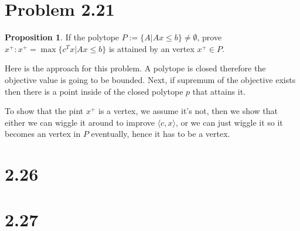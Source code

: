 \documentclass[]{article}
\theoremstyle{definition}
\newtheorem{prop}{Proposition}
\begin{document}
\section{Problem 2.21}
    \begin{prop}
        If the polytope $P:= \{A| Ax \le b\}\neq \emptyset$, prove $x^+: x^+ = \max \{c^Tx | Ax \le b\}$ is attained by an vertex $x^+\in P$. 
    \end{prop}
    \par
    Here is the approach for this problem. A polytope is closed therefore the objective value is going to be bounded. Next, if supremum of the objective exists then there is a point inside of the closed polytope $p$ that attains it. 
    \par
    To show that the pint $x^+$ is a vertex, we assume it's not, then we show that either we can wiggle it around to improve $\langle c, x\rangle$, or we can just wiggle it so it becomes an vertex in $P$ eventually, hence it has to be a vertex. 

\section*{2.26}

\section*{2.27}
\end{document}
